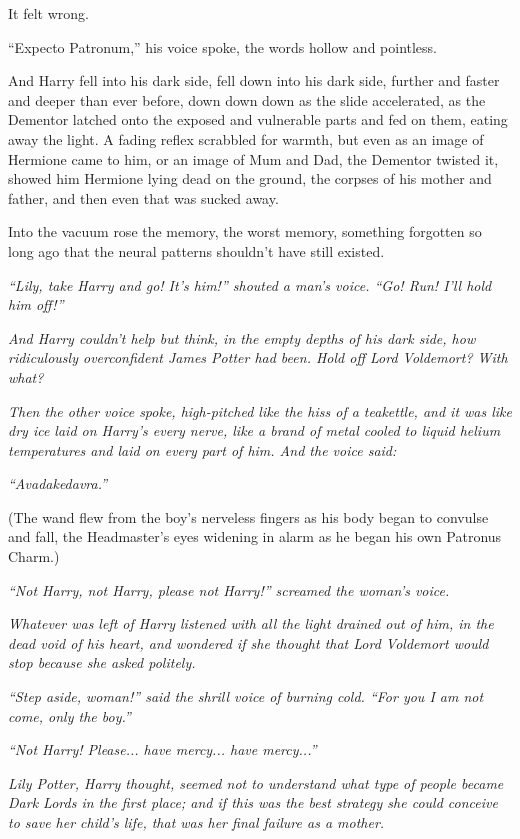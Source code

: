 It felt wrong.

``Expecto Patronum,'' his voice spoke, the words hollow and pointless.

And Harry fell into his dark side, fell down into his dark side, further and faster and deeper than ever before, down down down as the slide accelerated, as the Dementor latched onto the exposed and vulnerable parts and fed on them, eating away the light. A fading reflex scrabbled for warmth, but even as an image of Hermione came to him, or an image of Mum and Dad, the Dementor twisted it, showed him Hermione lying dead on the ground, the corpses of his mother and father, and then even that was sucked away.

Into the vacuum rose the memory, the worst memory, something forgotten so long ago that the neural patterns shouldn't have still existed.

\emph{``Lily, take Harry and go! It's him!'' shouted a man's voice. ``Go! Run! I'll hold him off!''}

\emph{And Harry couldn't help but think, in the empty depths of his dark side, how ridiculously overconfident James Potter had been. Hold off Lord Voldemort? With what?}

\emph{Then the other voice spoke, high-pitched like the hiss of a teakettle, and it was like dry ice laid on Harry's every nerve, like a brand of metal cooled to liquid helium temperatures and laid on every part of him. And the voice said:}

\emph{``Avadakedavra.''}

(The wand flew from the boy's nerveless fingers as his body began to convulse and fall, the Headmaster's eyes widening in alarm as he began his own Patronus Charm.)

\emph{``Not Harry, not Harry, please not Harry!'' screamed the woman's voice.}

\emph{Whatever was left of Harry listened with all the light drained out of him, in the dead void of his heart, and wondered if she thought that Lord Voldemort would stop because she asked politely.}

\emph{``Step aside, woman!'' said the shrill voice of burning cold. ``For you I am not come, only the boy.''}

\emph{``Not Harry! Please... have mercy... have mercy...''}

\emph{Lily Potter, Harry thought, seemed not to understand what type of people became Dark Lords in the first place; and if this was the best strategy she could conceive to save her child's life, that was her final failure as a mother.}

